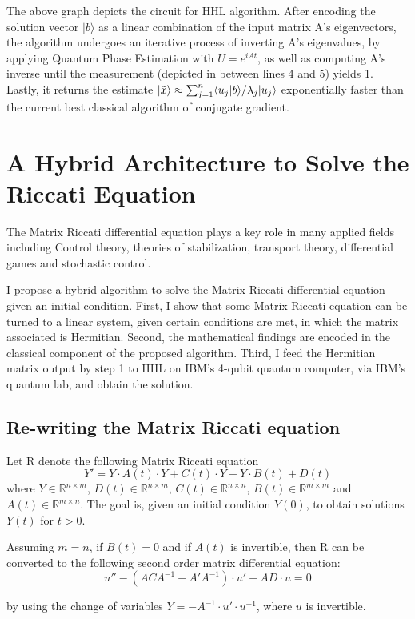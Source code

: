 The above graph depicts the circuit for HHL algorithm. After encoding the solution vector $|b \rangle$ as a linear combination of the input matrix A's eigenvectors, the algorithm undergoes an iterative process of inverting A's eigenvalues, by applying Quantum Phase Estimation with $U = e^{iAt}$, as well as computing A's inverse until the measurement (depicted in between lines 4 and 5) yields 1. Lastly, it returns the estimate $|\Tilde{x}\rangle \approx \sum_{j=1}^n \langle u_j|b \rangle / \lambda_j|u_j\rangle$ exponentially faster than the current best classical algorithm of conjugate gradient.

\section{A Hybrid Architecture to Solve the Riccati Equation}

The Matrix Riccati differential equation plays a key role in many applied fields including Control theory, theories of stabilization, transport theory, differential games and stochastic control.

I propose a hybrid algorithm to solve the Matrix Riccati differential equation given an initial condition. First, I show that some  Matrix Riccati equation can be turned to a linear system, given certain conditions are met, in which the matrix associated is Hermitian. Second, the mathematical findings are encoded in the classical component of the proposed algorithm. Third, I feed the Hermitian matrix output by step 1 to HHL on IBM's 4-qubit quantum computer, via IBM's quantum lab, and obtain the solution.

\subsection{Re-writing the Matrix Riccati equation}

Let R denote the following Matrix Riccati equation
\begin{equation}
\tag{R}
    Y' = Y\cdot A(t) \cdot Y + C(t)\cdot Y + Y\cdot B(t) + D(t)
\end{equation}
where $Y \in \mathbb{R}^{ n \times m}$, $D(t) \in \mathbb{R}^{ n \times m}$, $C(t) \in \mathbb{R}^{ n \times n}$, $B(t) \in \mathbb{R}^{m \times m}$ and $A(t) \in \mathbb{R}^{ m \times n}$.
The goal is, given an initial condition $Y(0)$, to obtain solutions $Y(t)$ for $t > 0$.

\begin{theorem}
Assuming $m = n$, if $B(t) = 0$ and if $A(t)$ is invertible, then R can be converted to the following second order matrix differential equation:
\begin{equation*}
    u'' - (ACA^{-1} + A'A^{-1})\cdot u' + AD \cdot u = 0
\end{equation*}

by using the change of variables $Y = - A^{-1} \cdot u' \cdot u^{-1}$, where $u$ is invertible. 
\end{theorem}

